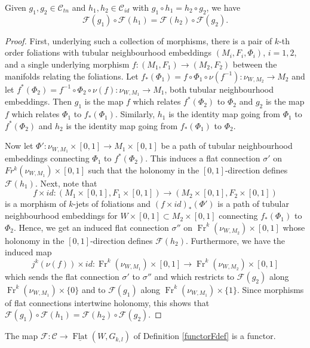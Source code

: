 \documentclass[10pt]{amsart}
\newcommand{\F}{{\mathcal{F}}}
\newcommand{\FlatCat}{{\underline{\operatorname{Flat}}}}
\newcommand{\Fr}{{\operatorname{Fr}}}
\numberwithin{theoremalpha}{section}
\numberwithin{equation}{section}
\numberwithin{definition}{section}
\numberwithin{theorem}{section}
\numberwithin{proposition}{section}
\numberwithin{lemma}{section}
\numberwithin{example}{section}
\numberwithin{remark}{section}
\numberwithin{corollary}{section}
\numberwithin{question}{section}
\numberwithin{problem}{section}
\numberwithin{assumption}{section}
\theoremstyle{named}
\numberwithin{equation}{section}
\begin{document}
\begin{proposition} \label{Fwelldef}
Given $g_{1}, g_{2} \in \mathcal{C}_{tn}$ and $h_{1}, h_{2} \in \mathcal{C}_{id}$ with $g_{1} \circ h_{1} = h_{2} \circ g_{2}$, we have 
\[ \F(g_{1}) \circ \F(h_{1}) = \F(h_{2}) \circ \F(g_{2}). \]
\end{proposition}
\begin{proof} 
First, underlying such a collection of morphisms, there is a pair of $k$-th order foliations with tubular neighbourhood embeddings $(M_{i}, F_{i}, \Phi_{i})$, $i = 1, 2$, and a single underlying morphism $f: (M_{1}, F_{1}) \to (M_{2}, F_{2})$ between the manifolds relating the foliations. Let $f_{*}(\Phi_{1}) = f \circ \Phi_{1} \circ \nu(f^{-1}) : \nu_{W, M_{2}} \to M_{2}$ and let $f^{*}(\Phi_{2}) = f^{-1} \circ \Phi_{2} \circ \nu(f) : \nu_{W, M_{1}} \to M_{1}$, both tubular neighbourhood embeddings. Then $g_{1}$ is the map $f$ which relates $f^{*}(\Phi_{2})$ to $\Phi_{2}$ and $g_{2}$ is the map $f$ which relates $\Phi_{1}$ to $f_{*}(\Phi_{1})$. Similarly, $h_{1}$ is the identity map going from $\Phi_{1}$ to $f^{*}(\Phi_{2})$ and $h_{2}$ is the identity map going from $f_{*}(\Phi_{1})$ to $\Phi_{2}$. 

Now let $\Phi' : \nu_{W,M_{1}} \times [0,1] \to M_{1} \times [0,1]$ be a path of tubular neighbourhood embeddings connecting $\Phi_{1}$ to $f^{*}(\Phi_{2})$. This induces a flat connection $\sigma'$ on $Fr^{k}(\nu_{W,M_{1}}) \times [0,1]$ such that the holonomy in the $[0,1]$-direction defines $\F(h_{1})$. Next, note that 
\[
f \times id : (M_{1} \times [0,1], F_{1} \times [0,1]) \to  (M_{2} \times [0,1], F_{2} \times [0,1])
\]
is a morphism of $k$-jets of foliations and $(f \times id)_{*}(\Phi')$ is a path of tubular neighbourhood embeddings for $W \times [0,1] \subset M_{2} \times [0,1]$ connecting $f_{*}(\Phi_{1})$ to $\Phi_{2}$. Hence, we get an induced flat connection $\sigma''$ on $\Fr^{k}(\nu_{W,M_{2}}) \times [0,1]$ whose holonomy in the $[0,1]$-direction defines $\F(h_{2})$. Furthermore, we have the induced map 
\[
j^{k}(\nu(f)) \times id : \Fr^{k}( \nu_{W, M_{1}}) \times [0,1] \to \Fr^{k}( \nu_{W, M_{2}}) \times [0,1]
\]
which sends the flat connection $\sigma'$ to $\sigma''$ and which restricts to $\F(g_2)$ along $\Fr^{k}( \nu_{W, M_{1}})  \times \{ 0 \} $ and to $\F(g_{1})$ along $\Fr^{k}( \nu_{W, M_{1}}) \times \{ 1 \}$. Since morphisms of flat connections intertwine holonomy, this shows that $\F(g_{1}) \circ \F(h_{1}) = \F(h_{2}) \circ \F(g_{2})$. 
\end{proof}
\begin{corollary}
The map $\F: \mathcal{C} \to \FlatCat(W,G_{k,l})$ of Definition \ref{functorFdef} is a functor.
\end{corollary}
\end{document}

